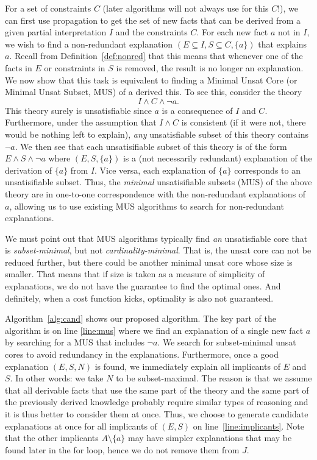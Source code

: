 For a set of constraints $C$ (later algorithms will not always use \allconstraints for this $C$!), we can first use propagation to get the set of new facts that can be derived from a given partial interpretation $I$ and the constraints $C$. For each new fact $a$ not in $I$, we wish to find a non-redundant explanation $(E \subseteq I, S \subseteq C,\{a\})$ that explains $a$. Recall from Definition~\ref{def:nonred} that this means that whenever one of the facts in $E$ or constraints in $S$ is removed, the result is no longer an explanation. 
We now show that this task is equivalent to finding a Minimal Unsat Core (or Minimal Unsat Subset, MUS) of a derived this.
To see this, consider the theory 
\[ I\wedge C \wedge \lnot a.\]
This theory surely is unsatisfiable since $a$ is a consequence of $I$ and $C$. 
Furthermore, under the assumption that $I\wedge C$ is consistent (if it were not, there would be nothing left to explain), 
\emph{any} unsatisfiable subset of this theory contains $\lnot a$.
We then see that each unsatisifiable subset of this theory is of the form $E \wedge S \wedge \lnot a$ where $(E,S,\{a\})$ is a (not necessarily redundant) explanation of the derivation of $\{a\}$ from $I$. 
Vice versa, each explanation of $\{a\}$ corresponds to an unsatisifiable subset. Thus, the \emph{minimal} unsatisifiable subsets (MUS) of the above theory are in one-to-one correspondence with the non-redundant explanations of $a$, allowing us to use existing MUS algorithms to search for non-redundant explanations. 

We must point out that MUS algorithms typically find \textit{an} unsatisfiable core that is \textit{subset-minimal}, but not \textit{cardinality-minimal}. That is, the unsat core can not be reduced further, but there could be another minimal unsat core whose size is smaller.
That means that if size is taken as a measure of simplicity of explanations, we do not have the guarantee to find the optimal ones. And definitely, when a cost function kicks, optimality is also not guaranteed. 

Algorithm~\ref{alg:cand} shows our proposed algorithm. The key part of the algorithm is on line \ref{line:mus} where we find an explanation of a single new fact $a$ by searching for a MUS that includes $\neg a$.
We search for subset-minimal unsat cores to avoid redundancy in the explanations.
Furthermore, once a good explanation $(E,S,N)$ is found, we immediately explain all implicants of $E$ and $S$. In other words: we take $N$ to be subset-maximal. 
The reason is that we assume that all derivable facts that use the same part of the theory and the same part of the previously derived knowledge probably require similar types of reasoning and it is thus better to consider them at once. 
Thus, we choose to generate candidate explanations at once for all implicants of $(E, S)$ on line~\ref{line:implicants}. 
Note that the other implicants $A \setminus \{a\}$ may have simpler explanations that may be found later in the for loop, hence we do not remove them from $J$.

